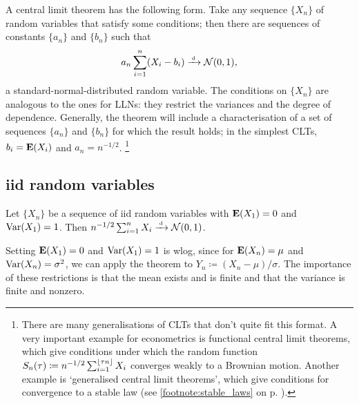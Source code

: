 \documentclass[11pt,letterpaper,reqno,oneside]{article}
\begin{document}
A central limit theorem has the following form. Take any sequence $\{ X_n \}$ of random variables that satisfy some conditions; then there are sequences of constants $\{ a_n \}$ and $\{ b_n \}$ such that
%
\begin{equation*}
	a_n \sum_{i=1}^n ( X_i - b_i ) \xrightarrow{{\scriptscriptstyle \mathrm{\;d\;}}} \mathcal{N}(0,1) ,
\end{equation*}
%
a standard-normal-distributed random variable. The conditions on $\{ X_n \}$ are analogous to the ones for LLNs: they restrict the variances and the degree of dependence. Generally, the theorem will include a characterisation of a set of sequences $\{ a_n \}$ and $\{ b_n \}$ for which the result holds; in the simplest CLTs, $b_i = \mathbf{E}(X_i)$ and $a_n = n^{-1/2}$.%
	\footnote{There are many generalisations of CLTs that don't quite fit this format. A very important example for econometrics is functional central limit theorems, which give conditions under which the random function $S_n(\tau) \coloneqq n^{-1/2} \sum_{i=1}^{\lfloor \tau n\rfloor} X_i$ converges weakly to a Brownian motion. Another example is `generalised central limit theorems', which give conditions for convergence to a stable law (see \cref{footnote:stable_laws} on p. \pageref{footnote:stable_laws}).}



\subsection{iid random variables}
\label{sec:CLTs:Lindeberg-Levy_CLT}

\begin{theorem}
	\label{theorem:Lindeberg-Levy}
	Let $\{ X_n \}$ be a sequence of iid random variables with $\mathbf{E}(X_1)=0$ and $\mathrm{Var}(X_1)=1$. Then $n^{-1/2} \sum_{i=1}^n X_i \xrightarrow{{\scriptscriptstyle \mathrm{\;d\;}}} \mathcal{N}(0,1)$.
\end{theorem}


\begin{remark}
	Setting $\mathbf{E}(X_1)=0$ and $\mathrm{Var}(X_1)=1$ is wlog, since for $\mathbf{E}(X_n)=\mu$ and $\mathrm{Var}(X_n)=\sigma^2$, we can apply the theorem to $Y_n \coloneqq ( X_n - \mu ) / \sigma$. The importance of these restrictions is that the mean exists and is finite and that the variance is finite and nonzero.
\end{remark}
\end{document}
